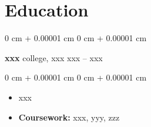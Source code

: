 \documentclass[10pt, letterpaper]{article}
\newenvironment{highlights}{
    \begin{itemize}[
        topsep=0.10 cm,
        parsep=0.10 cm,
        partopsep=0pt,
        itemsep=0pt,
        leftmargin=0 cm + 10pt
    ]
}{
    \end{itemize}
} %
\newenvironment{onecolentry}{
    \begin{adjustwidth}{
        0 cm + 0.00001 cm
    }{
        0 cm + 0.00001 cm
    }
}{
    \end{adjustwidth}
} %
\newenvironment{twocolentry}[2][]{
    \onecolentry
    \def\secondColumn{#2}
    \setcolumnwidth{\fill, 4.5 cm}
    \begin{paracol}{2}
}{
    \switchcolumn \raggedleft \secondColumn
    \end{paracol}
    \endonecolentry
} %
\begin{document}
    \section{Education}

        \begin{twocolentry}{
            xxx – xxx
        }
            \textbf{xxx} college, xxx\end{twocolentry}

        \vspace{0.10 cm}
        \begin{onecolentry}
            \begin{highlights}
                \item xxx 
                \item \textbf{Coursework:} xxx, yyy, zzz
            \end{highlights}
        \end{onecolentry}
\end{document}
